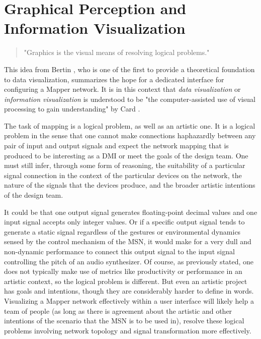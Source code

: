 \section{Graphical Perception and Information Visualization}

\begin{quote}
"Graphics is the visual means of resolving logical problems." \cite{bertin1981}
\end{quote}

This idea from Bertin \cite{semiology1983}, who is one of the first to provide a theoretical foundation to data visualization, summarizes the hope for a dedicated interface for configuring a Mapper network. It is in this context that \emph{data visualization} or \emph{information visualization} is understood to be "the computer-assisted use of visual processing to gain understanding" by Card \cite{card1997}. 

The task of mapping is a logical problem, as well as an artistic one. It is a logical problem in the sense that one cannot make connections haphazardly between any pair of input and output signals and expect the network mapping that is produced to be interesting as a DMI or meet the goals of the design team. One must still infer, through some form of reasoning, the suitability of a particular signal connection in the context of the particular devices on the network, the nature of the signals that the devices produce, and the broader artistic intentions of the design team. 

It could be that one output signal generates floating-point decimal values and one input signal accepts only integer values. Or if a specific output signal tends to generate a static signal regardless of the gestures or environmental dynamics sensed by the control mechanism of the MSN, it would make for a very dull and non-dynamic performance to connect this output signal to the input signal controlling the pitch of an audio synthesizer. Of course, as previously stated, one does not typically make use of metrics like productivity or performance in an artistic context, so the logical problem is different. But even an artistic project has goals and intentions, though they are considerably harder to define in words. Visualizing a Mapper network effectively within a user interface will likely help a team of people (as long as there is agreement about the artistic and other intentions of the scenario that the MSN is to be used in), resolve these logical problems involving network topology and signal transformation more effectively. 

